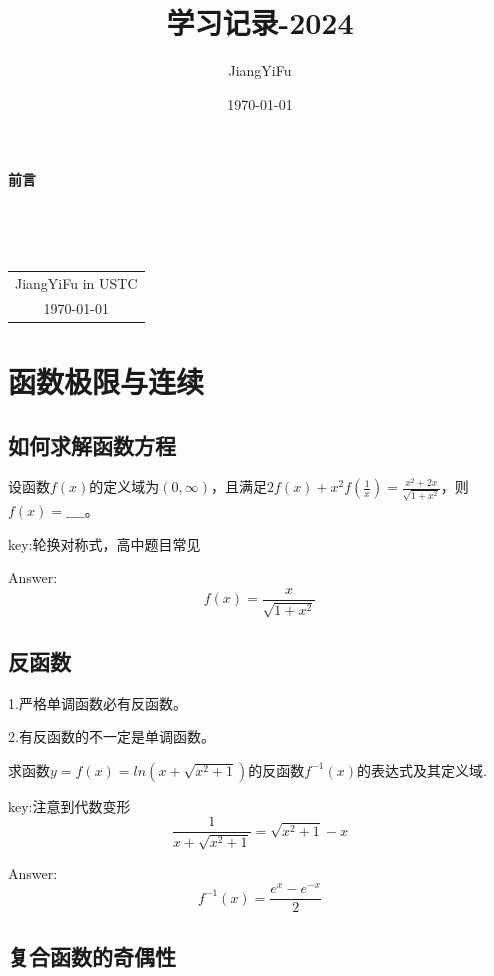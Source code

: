 \documentclass[12pt, a4paper, oneside]{ctexbook}
\title{{\Huge{\textbf{学习记录-2024}}}}
\author{JiangYiFu}
\date{\today}
\begin{document}
\maketitle

\setcounter{page}{1}

\begin{center}
    \Huge\textbf{前言}
\end{center}~\


~\\
\begin{flushright}
    \begin{tabular}{c}
        JiangYiFu in USTC\\
        \today
    \end{tabular}
\end{flushright}

\newpage
{}
\setcounter{page}{1}
\tableofcontents
\newpage
\setcounter{page}{1}

\chapter{函数极限与连续}


\section{如何求解函数方程}

设函数$f(x)$的定义域为$(0,\infty)$，且满足$2f(x)+x^2f(\frac{1}{x})=\frac{x^2+2x}{\sqrt{1+x^2}}$，则$f(x)=\_\_\_\_$。

key:轮换对称式，高中题目常见

Answer:
\[f(x)=\frac{x}{\sqrt{1+x^2}}\]

\section{反函数}

1.严格单调函数必有反函数。

2.有反函数的不一定是单调函数。

\hspace*{\fill}

求函数$y=f(x)=ln(x+\sqrt{x^2+1})$的反函数$f^{-1}(x)$的表达式及其定义域.

key:注意到代数变形
\[ \frac{1}{x+\sqrt{x^2+1}}=\sqrt{x^2+1}-x\]

Answer:
\[f^{-1}(x)=\frac{e^x-e^{-x}}{2}\]

\section{复合函数的奇偶性}
\end{document}
